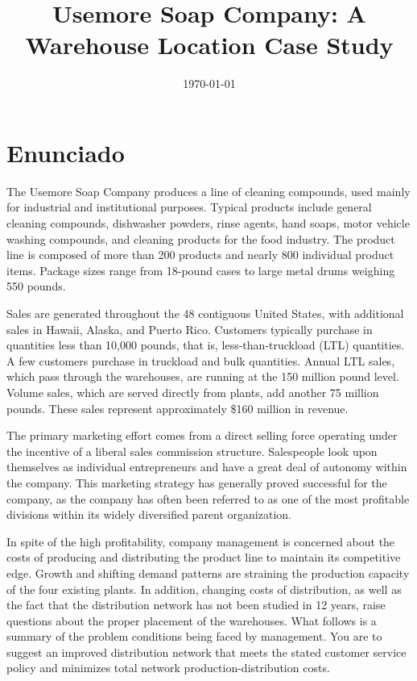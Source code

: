 \documentclass[12pt,a4paper]{article}
\title{Usemore Soap Company: A Warehouse Location Case Study}
\author{}
\date{\today}
\begin{document}
\maketitle


\section{Enunciado}

The Usemore Soap Company produces a line of cleaning compounds, used mainly for industrial and institutional purposes.
Typical products include general cleaning compounds, dishwasher powders, rinse agents, hand soaps, motor vehicle washing compounds, and cleaning products for the food industry.
The product line is composed of more than 200 products and nearly 800 individual product items.
Package sizes range from 18-pound cases to large metal drums weighing 550 pounds.

Sales are generated throughout the 48 contiguous United States, with additional sales in Hawaii, Alaska, and Puerto Rico.
Customers typically purchase in quantities less than 10,000 pounds, that is, less-than-truckload (LTL) quantities.
A few customers purchase in truckload and bulk quantities.
Annual LTL sales, which pass through the warehouses, are running at the 150 million pound level.
Volume sales, which are served directly from plants, add another 75 million pounds.
These sales represent approximately \$160 million in revenue.

The primary marketing effort comes from a direct selling force operating under the incentive of a liberal sales commission structure.
Salespeople look upon themselves as individual entrepreneurs and have a great deal of autonomy within the company.
This marketing strategy has generally proved successful for the company, as the company has often been referred to as one of the most profitable divisions within its widely
diversified parent organization.

In spite of the high profitability, company management is concerned about the costs of producing and distributing the product line to maintain its competitive edge.
Growth and shifting demand patterns are straining the production capacity of the four existing plants.
In addition, changing costs of distribution, as well as the fact that the distribution network has not been studied in 12 years, raise questions about the proper placement of the warehouses.
What follows is a summary of the problem conditions being faced by management.
You are to suggest an improved distribution network that meets the stated customer service policy and minimizes total network production-distribution costs.
\end{document}
